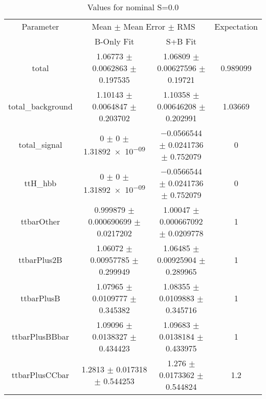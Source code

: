 \begin{table}
\centering
\caption{Values for nominal S=0.0}
\begin{tabular}{cccc}
\toprule
Parameter & \multicolumn{2}{c}{Mean $\pm$ Mean Error $\pm$ RMS} & Expectation\\
 & B-Only Fit & S+B Fit & \\
\midrule
total & \num{1.06773} $\pm$ \num{0.0062863} $\pm$ \num{0.197535} & \num{1.06809} $\pm$ \num{0.00627596} $\pm$ \num{0.19721} & \num{0.989099}\\
total\_background & \num{1.10143} $\pm$ \num{0.0064847} $\pm$ \num{0.203702} & \num{1.10358} $\pm$ \num{0.00646208} $\pm$ \num{0.202991} & \num{1.03669}\\
total\_signal & \num{0} $\pm$ \num{0} $\pm$ \num{1.31892e-09} & \num{-0.0566544} $\pm$ \num{0.0241736} $\pm$ \num{0.752079} & \num{0}\\
ttH\_hbb & \num{0} $\pm$ \num{0} $\pm$ \num{1.31892e-09} & \num{-0.0566544} $\pm$ \num{0.0241736} $\pm$ \num{0.752079} & \num{0}\\
ttbarOther & \num{0.999879} $\pm$ \num{0.000690699} $\pm$ \num{0.0217202} & \num{1.00047} $\pm$ \num{0.000667092} $\pm$ \num{0.0209778} & \num{1}\\
ttbarPlus2B & \num{1.06072} $\pm$ \num{0.00957785} $\pm$ \num{0.299949} & \num{1.06485} $\pm$ \num{0.00925904} $\pm$ \num{0.289965} & \num{1}\\
ttbarPlusB & \num{1.07965} $\pm$ \num{0.0109777} $\pm$ \num{0.345382} & \num{1.08355} $\pm$ \num{0.0109883} $\pm$ \num{0.345716} & \num{1}\\
ttbarPlusBBbar & \num{1.09096} $\pm$ \num{0.0138327} $\pm$ \num{0.434423} & \num{1.09683} $\pm$ \num{0.0138184} $\pm$ \num{0.433975} & \num{1}\\
ttbarPlusCCbar & \num{1.2813} $\pm$ \num{0.017318} $\pm$ \num{0.544253} & \num{1.276} $\pm$ \num{0.0173362} $\pm$ \num{0.544824} & \num{1.2}\\
\bottomrule
\end{tabular}
\end{table}